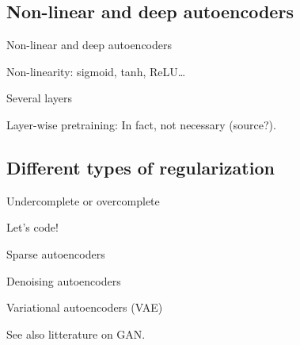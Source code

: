 \documentclass{beamer}
\begin{document}
  \subsection{Non-linear and deep autoencoders}

  \begin{frame}{Non-linear and deep autoencoders}

    Non-linearity: sigmoid, tanh, ReLU\dots

    Several layers

    Layer-wise pretraining: \cite{Hinton2006}
    In fact, not necessary (source?).
    
  \end{frame}

  \subsection{Different types of regularization}

  \begin{frame}{Undercomplete or overcomplete}
    
  \end{frame}

  \begin{frame}{Let's code!}

    
  \end{frame}

  \begin{frame}{Sparse autoencoders}
    
  \end{frame}

  \begin{frame}{Denoising autoencoders}

    \cite{Vincent2010}
    
  \end{frame}

  \begin{frame}{Variational autoencoders (VAE)}
    
    \cite{Kingma2014}


    See also litterature on GAN.

  \end{frame}
\end{document}
